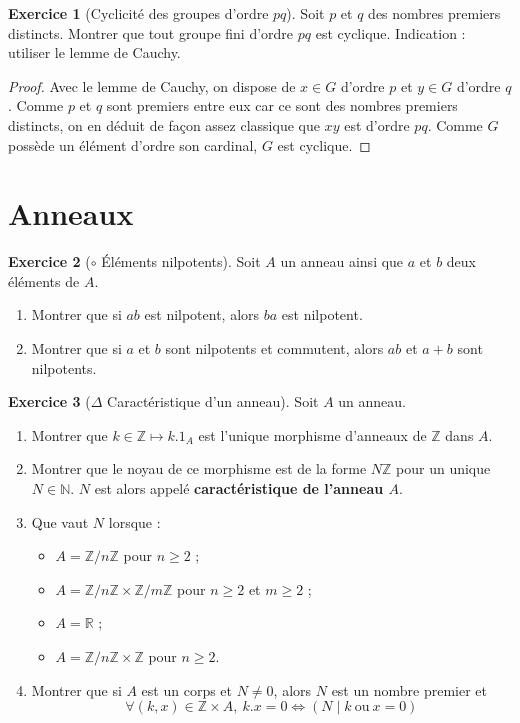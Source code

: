 \documentclass[french]{book}
\newcommand{\N}{\mathbb{N}}
\newcommand{\Z}{\mathbb{Z}}
\newcommand{\R}{\mathbb{R}}
\theoremstyle{definition}
\newtheorem{ex}{Exercice}[chapter]
\theoremstyle{theorem}
\theoremstyle{remark}
\begin{document}
\begin{ex}[Cyclicité des groupes d'ordre $pq$]
	Soit $p$ et $q$ des nombres premiers distincts. Montrer que tout groupe fini d'ordre $pq$ est cyclique. Indication : utiliser le lemme de Cauchy.
\end{ex}

\begin{proof}
	Avec le lemme de Cauchy, on dispose de $x\in G$ d'ordre $p$ et $y\in G$ d'ordre $q$. Comme $p$ et $q$ sont premiers entre eux car ce sont des nombres premiers distincts, on en déduit de façon assez classique que $xy$ est d'ordre $pq$. Comme $G$ possède un élément d'ordre son cardinal, $G$ est cyclique.
\end{proof}

\section{Anneaux}

\begin{ex}[$\circ$ Éléments nilpotents]
	Soit $A$ un anneau ainsi que $a$ et $b$ deux éléments de $A$.
	\begin{enumerate}
		\item Montrer que si $ab$ est nilpotent, alors $ba$ est nilpotent.
		\item Montrer que si $a$ et $b$ sont nilpotents et commutent, alors $ab$ et $a+b$ sont nilpotents.
	\end{enumerate}
\end{ex}

\begin{ex}[$\Delta$ Caractéristique d'un anneau]
	Soit $A$ un anneau.
	\begin{enumerate}
		\item Montrer que $k\in\Z\mapsto k.1_A$ est l'unique morphisme d'anneaux de $\Z$ dans $A$.
		\item Montrer que le noyau de ce morphisme est de la forme $N\Z$ pour un unique $N\in\N$. $N$ est alors appelé \textbf{caractéristique de l'anneau $A$}.
		\item Que vaut $N$ lorsque :
		\begin{itemize}
			\item $A=\Z/n\Z$ pour $n\geqslant 2$ ;
			\item $A=\Z/n\Z\times\Z/m\Z$ pour $n\geqslant 2$ et $m\geqslant2$ ;
			\item $A=\R$ ;
			\item $A=\Z/n\Z\times \Z$ pour $n\geqslant 2$.
		\end{itemize}
		\item Montrer que si $A$ est un corps et $N\ne 0$, alors $N$ est un nombre premier et $$\forall (k,x)\in\Z\times A,\ k.x=0\iff (N\mid k\ \text{ou}\ x=0)$$
	\end{enumerate}
\end{ex}
\end{document}

